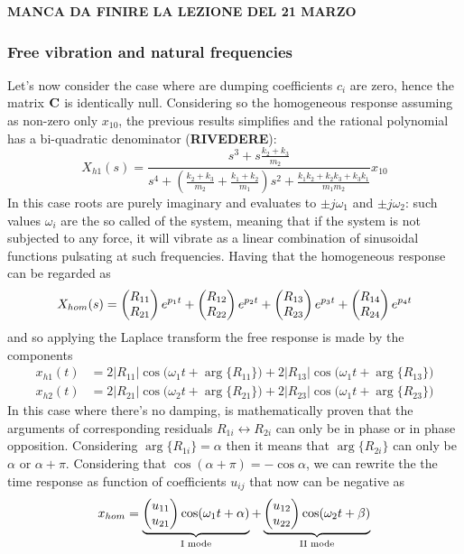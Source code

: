 	\textbf{MANCA DA FINIRE LA LEZIONE DEL 21 MARZO}
	
	
\subsubsection{Free vibration and natural frequencies}
	Let's now consider the case where are dumping coefficients $c_i$ are zero, hence the matrix $\mat C$ is identically null. Considering so the homogeneous response assuming as non-zero only $x_{10}$, the previous results simplifies and the rational polynomial has a bi-quadratic denominator (\textbf{RIVEDERE}):
	\[ X_{h1}(s) = \frac{s^3 + s \frac{k_2+ k_3}{m_2}}{ s^4 + \left( \frac{k_2 + k_3}{m_2} + \frac{k_1 + k_2}{m_1} \right) s^2 + \frac{k_1 k_2 + k_2 k_3 + k_3 k_1}{m_1 m_2} } x_{10} \]
	In this case roots are purely imaginary and evaluates to $\pm j \omega_1$ and $\pm j \omega_2$: such values $\omega_i$ are the so called  of the system, meaning that if the system is not subjected to any force, it will vibrate as a linear combination of sinusoidal functions pulsating at such frequencies. Having that the homogeneous response can be regarded as
	\[ X_{hom}(s) = \vec{R_{11} \\ R_{21} } e^{p_1 t} + \vec{R_{12} \\ R_{22} } e^{p_2 t} + \vec{R_{13} \\ R_{23} } e^{p_3 t} + \vec{R_{14} \\ R_{24} } e^{p_4 t} \]
	and so applying the Laplace transform the free response is made by the components
	\begin{align*}
		x_{h1}(t) &= 2 |R_{11}| \cos\big(\omega_1 t + \arg\{R_{11}\}\big) + 2 |R_{13}| \cos\big(\omega_1 t + \arg\{R_{13}\}\big) \\
		x_{h2}(t) &= 2 |R_{21}| \cos\big(\omega_2 t + \arg\{R_{21}\}\big) + 2 |R_{23}| \cos\big(\omega_1 t + \arg\{R_{23}\}\big) 		
	\end{align*}
	In this case where there's no damping, is mathematically proven that the arguments of corresponding residuals $R_{1i}\leftrightarrow R_{2i}$ can only be in phase or in phase opposition. Considering $\arg\{R_{1i}\} = \alpha$ then it means that $\arg\{R_{2i}\}$ can only be $\alpha$ or $\alpha +\pi$. Considering that $\cos(\alpha + \pi) = -\cos\alpha$, we can rewrite the the time response as function of coefficients $u_{ij}$ that now can be negative as
	\begin{equation} \label{eq:2dof:homogeneousresponse}
		 x_{hom} = \underbrace{\vec{u_{11} \\ u_{21}} \cos(\omega_1 t + \alpha)}_\textrm{I mode} + \underbrace{\vec{u_{12} \\ u_{22}} \cos(\omega_2 t + \beta)}_\textrm{II mode}
	\end{equation}

